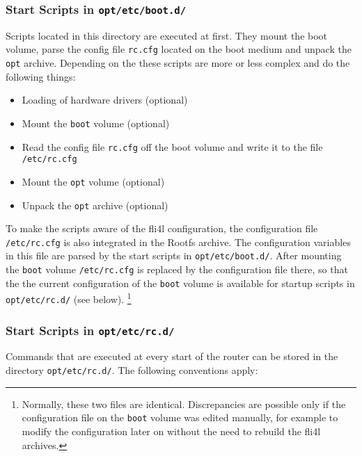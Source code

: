 \subsubsection{Start Scripts in \texttt{opt/etc/boot.d/}}

Scripts located in this directory are executed at first. They mount the boot
volume, parse the config file \texttt{rc.cfg} located on the boot medium and
unpack the \texttt{opt} archive. Depending on the  these scripts are
more or less complex and do the following things:

\begin{itemize}
\item Loading of hardware drivers (optional)
\item Mount the \texttt{boot} volume (optional)
\item Read the config file \texttt{rc.cfg} off the boot volume and
      write it to the file \texttt{/etc/rc.cfg}
\item Mount the \texttt{opt} volume (optional)
\item Unpack the \texttt{opt} archive (optional)
\end{itemize}

To make the scripts aware of the fli4l configuration,
the configuration file \texttt{/etc/rc.cfg} is also integrated 
in the Rootfs archive. The configuration variables
in this file are parsed by the start scripts in \texttt{opt/etc/boot.d/}.
After mounting the \texttt{boot} volume \texttt{/etc/rc.cfg} is replaced
by the configuration file there, so that the the current configuration
of the \texttt{boot} volume is available for startup scripts in
\texttt{opt/etc/rc.d/} (see below).
\footnote{Normally, these two files are identical. Discrepancies
are possible only if the configuration file on the \texttt{boot} volume
was edited manually, for example to modify the configuration later on
without the need to rebuild the fli4l archives.}

\subsubsection{Start Scripts in \texttt{opt/etc/rc.d/}}

Commands that are executed at every start of the router can be stored
in the directory \texttt{opt/etc/rc.d/}. The following conventions
apply:


